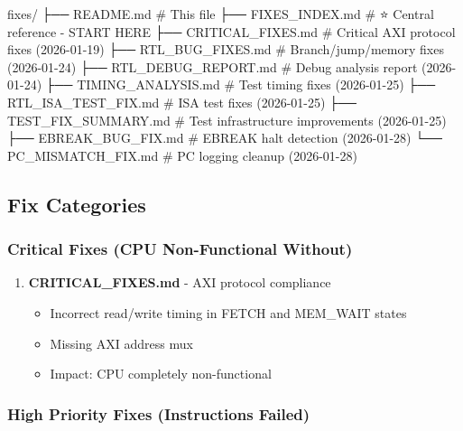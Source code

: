 \begin{record}

\begin{textblock}
fixes/
├── README.md                    # This file
├── FIXES_INDEX.md              # ⭐ Central reference - START HERE
├── CRITICAL_FIXES.md           # Critical AXI protocol fixes (2026-01-19)
├── RTL_BUG_FIXES.md            # Branch/jump/memory fixes (2026-01-24)
├── RTL_DEBUG_REPORT.md         # Debug analysis report (2026-01-24)
├── TIMING_ANALYSIS.md          # Test timing fixes (2026-01-25)
├── RTL_ISA_TEST_FIX.md         # ISA test fixes (2026-01-25)
├── TEST_FIX_SUMMARY.md         # Test infrastructure improvements (2026-01-25)
├── EBREAK_BUG_FIX.md           # EBREAK halt detection (2026-01-28)
└── PC_MISMATCH_FIX.md          # PC logging cleanup (2026-01-28)
\end{textblock}

\end{record}

\subsection{Fix Categories}\label{cr:fix:fixes-readme:fix-categories}

\subsubsection{Critical Fixes (CPU Non-Functional Without)}\label{cr:fix:fixes-readme:critical-fixes-cpu-non-functional-without}

\begin{record}

\begin{enumerate}
\def\labelenumi{\arabic{enumi}.}
\tightlist
\item
  \textbf{CRITICAL\_\allowbreak{}FIXES.md} - AXI protocol compliance

  \begin{itemize}
  \tightlist
  \item
    Incorrect read/\allowbreak{}write timing in FETCH and MEM\_WAIT
    states
  \item
    Missing AXI address mux
  \item
    Impact: CPU completely non-functional
  \end{itemize}
\end{enumerate}

\end{record}

\subsubsection{High Priority Fixes (Instructions Failed)}\label{cr:fix:fixes-readme:high-priority-fixes-instructions-failed}

